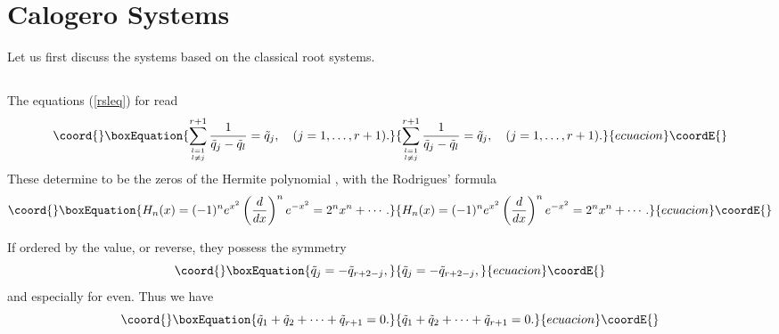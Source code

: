 \documentclass[a4paper,12pt]{article}
\begin{document}
\section{Calogero Systems}
\label{calsys}
\setcounter{equation}{0}

Let us first discuss the systems based on the classical root systems.
\subsection{\coordHE{}}

The equations (\ref{rsleq}) for \coordHE{} read
\begin{equation}\coord{}\boxEquation{
   \sum_{l=1\atop l\ne j}^{r+1}{1\over{\tilde{q}_j-\tilde{q}_l}}=\tilde{q}_j,
   \quad (j=1,\ldots,r+1).
   \label{herroots}
}{
   \sum_{l=1\atop l\ne j}^{r+1}{1\over{\tilde{q}_j-\tilde{q}_l}}=\tilde{q}_j,
   \quad (j=1,\ldots,r+1).
   }{ecuacion}\coordE{}\end{equation}
These determine \coordHE{} to be the zeros of the Hermite polynomial \coordHE{}
\cite{szego}, with the Rodrigues' formula
\begin{equation}\coord{}\boxEquation{
   H_n(x)=(-1)^ne^{x^2}\left({d\over{dx}}\right)^ne^{-x^2}
   =2^nx^n+\cdots.
}{
   H_n(x)=(-1)^ne^{x^2}\left({d\over{dx}}\right)^ne^{-x^2}
   =2^nx^n+\cdots.
}{ecuacion}\coordE{}\end{equation}

If ordered by the value, \coordHE{}
or reverse, they possess the symmetry
\begin{equation}\coord{}\boxEquation{
   \tilde{q}_j=-\tilde{q}_{r+2-j},
   \label{qj-qr+2-j}
}{
   \tilde{q}_j=-\tilde{q}_{r+2-j},
   }{ecuacion}\coordE{}\end{equation}
and especially \coordHE{} for \coordHE{} even. Thus we have
\begin{equation}\coord{}\boxEquation{
   \tilde{q}_1+\tilde{q}_2+\cdots+\tilde{q}_{r+1}=0.
   \label{sumzero}
}{
   \tilde{q}_1+\tilde{q}_2+\cdots+\tilde{q}_{r+1}=0.
   }{ecuacion}\coordE{}\end{equation}
\end{document}

